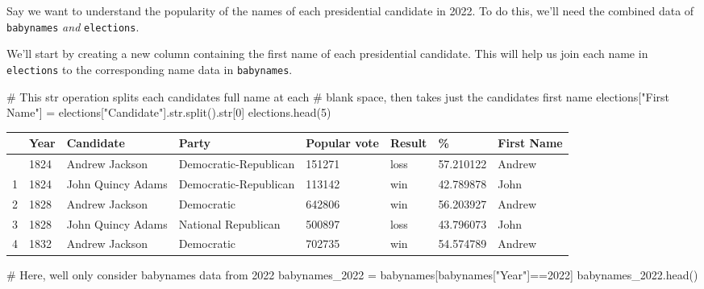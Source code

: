 \documentclass[
  letterpaper,
  DIV=11,
  numbers=noendperiod]{scrreprt}
\newenvironment{Shaded}{\begin{snugshade}}{\end{snugshade}}
\newcommand{\BuiltInTok}[1]{\textcolor[rgb]{0.00,0.23,0.31}{#1}}
\newcommand{\CommentTok}[1]{\textcolor[rgb]{0.37,0.37,0.37}{#1}}
\newcommand{\DecValTok}[1]{\textcolor[rgb]{0.68,0.00,0.00}{#1}}
\newcommand{\NormalTok}[1]{\textcolor[rgb]{0.00,0.23,0.31}{#1}}
\newcommand{\OperatorTok}[1]{\textcolor[rgb]{0.37,0.37,0.37}{#1}}
\newcommand{\StringTok}[1]{\textcolor[rgb]{0.13,0.47,0.30}{#1}}
\begin{document}
Say we want to understand the popularity of the names of each
presidential candidate in 2022. To do this, we'll need the combined data
of \texttt{babynames} \emph{and} \texttt{elections}.

We'll start by creating a new column containing the first name of each
presidential candidate. This will help us join each name in
\texttt{elections} to the corresponding name data in \texttt{babynames}.

\begin{Shaded}
\begin{Highlighting}[]
\CommentTok{\# This \textasciigrave{}str\textasciigrave{} operation splits each candidate\textquotesingle{}s full name at each }
\CommentTok{\# blank space, then takes just the candidate\textquotesingle{}s first name}
\NormalTok{elections[}\StringTok{"First Name"}\NormalTok{] }\OperatorTok{=}\NormalTok{ elections[}\StringTok{"Candidate"}\NormalTok{].}\BuiltInTok{str}\NormalTok{.split().}\BuiltInTok{str}\NormalTok{[}\DecValTok{0}\NormalTok{]}
\NormalTok{elections.head(}\DecValTok{5}\NormalTok{)}
\end{Highlighting}
\end{Shaded}

\begin{longtable}[]{@{}llllllll@{}}
\toprule\noalign{}
& Year & Candidate & Party & Popular vote & Result & \% & First Name \\
\midrule\noalign{}
\endhead
\bottomrule\noalign{}
\endlastfoot
0 & 1824 & Andrew Jackson & Democratic-Republican & 151271 & loss &
57.210122 & Andrew \\
1 & 1824 & John Quincy Adams & Democratic-Republican & 113142 & win &
42.789878 & John \\
2 & 1828 & Andrew Jackson & Democratic & 642806 & win & 56.203927 &
Andrew \\
3 & 1828 & John Quincy Adams & National Republican & 500897 & loss &
43.796073 & John \\
4 & 1832 & Andrew Jackson & Democratic & 702735 & win & 54.574789 &
Andrew \\
\end{longtable}

\begin{Shaded}
\begin{Highlighting}[]
\CommentTok{\# Here, we\textquotesingle{}ll only consider \textasciigrave{}babynames\textasciigrave{} data from 2022}
\NormalTok{babynames\_2022 }\OperatorTok{=}\NormalTok{ babynames[babynames[}\StringTok{"Year"}\NormalTok{]}\OperatorTok{==}\DecValTok{2022}\NormalTok{]}
\NormalTok{babynames\_2022.head()}
\end{Highlighting}
\end{Shaded}
\end{document}
